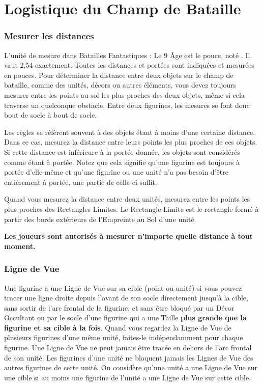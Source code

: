 
\part{Logistique du Champ de Bataille}

\hypertarget{measuringdistances}{\section{Mesurer les distances}}

L'unité de mesure dans Batailles Fantastiques : Le 9\ieme{} Âge est le pouce, noté \distance{}. Il vaut 2,54 {\centi\meter} exactement. Toutes les distances et portées sont indiquées et mesurées en pouces. Pour déterminer la distance entre deux objets sur le champ de bataille, comme des unités, décors ou autres éléments, vous devez toujours mesurer entre les points au sol les plus proches des deux objets, même si cela traverse un quelconque obstacle. Entre deux figurines, les mesures se font donc bout de socle à bout de socle.

Les règles se réfèrent souvent à des objets étant à moins d'une certaine distance. Dans ce cas, mesurez la distance entre leurs points les plus proches de ces objets. Si cette distance est inférieure à la portée donnée, les objets sont considérés comme étant à portée. Notez que cela signifie qu'une figurine est toujours à portée d'elle-même et qu'une figurine ou une unité n'a pas besoin d'être entièrement à portée, une partie de celle-ci suffit.

Quand vous mesurez la distance entre deux unités, mesurez entre les points les plus proches des Rectangles Limites. Le Rectangle Limite est le rectangle formé à partir des bords extérieurs de l'Empreinte au Sol d'une unité.
 
\textbf{Les joueurs sont autorisés à mesurer n'importe quelle distance à tout moment.}

\hypertarget{lineofsight}{\section{Ligne de Vue}}

Une figurine a une Ligne de Vue sur sa cible (point ou unité) si vous pouvez tracer une ligne droite depuis l'avant de son socle directement jusqu'à la cible, sans sortir de l'arc frontal de la figurine, et sans être bloqué par un Décor Occultant ou par le socle d'une figurine qui a une Taille \textbf{plus grande que la figurine et sa cible à la fois}. Quand vous regardez la Ligne de Vue de plusieurs figurines d'une même unité, faites-le indépendamment pour chaque figurine. Une Ligne de Vue ne peut jamais être tracée en dehors de l'arc frontal de son unité. Les figurines d'une unité ne bloquent jamais les Lignes de Vue des autres figurines de cette unité. On considère qu'une unité a une Ligne de Vue sur une cible si au moins une figurine de l'unité a une Ligne de Vue sur cette cible.

